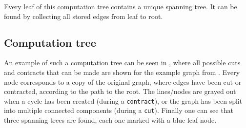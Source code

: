 Every leaf of this computation tree contains a unique spanning tree. It can be found by collecting all stored edges from leaf to root.

\subsection{Computation tree}

An example of such a computation tree can be seen in , where all possible cuts and contracts that can be made are shown for the example graph from . Every node corresponds to a copy of the original graph, where edges have been cut or contracted, according to the path to the root. The lines/nodes are grayed out when a cycle has been created (during a \texttt{contract}), or the graph has been split into multiple connected components (during a \texttt{cut}). Finally one can see that three spanning trees are found, each one marked with a blue leaf node.

